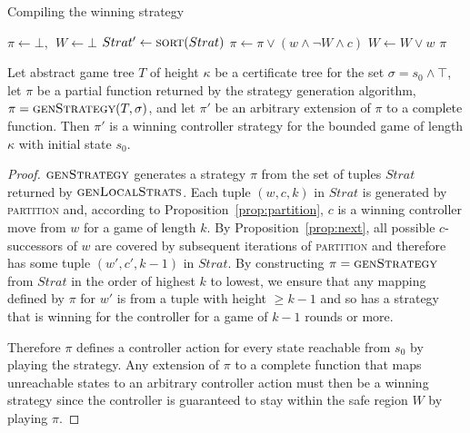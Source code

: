 \begin{algorithm}[t]
   \caption{Compiling the  winning strategy}\label{alg:compile}
   \begin{algorithmic}[1]
            \State $\pi \gets \bot,~~W \gets \bot$
            \State $Strat' \gets \Call{sort}{Strat}$ 
            \State $\pi \gets \pi \lor (w \land \neg W \land c)$
                \State $W \gets W \lor w$
            \EndFor
            \State \Return $\pi$
        \EndFunction
    \end{algorithmic}
\end{algorithm}

\begin{theorem}\label{th:stratCorrectness}
Let abstract game tree $T$ of height $\kappa$ be a certificate tree for the set $\sigma = s_0 \land \top$, let $\pi$ be a partial function returned by the strategy generation algorithm, $\pi=\textsc{genStrategy}(T,\sigma)$, and let $\pi'$ be an arbitrary extension of $\pi$ to a complete function.  Then $\pi'$ is a winning controller strategy for the bounded game of length $\kappa$ with initial state $s_0$.
\end{theorem}
\begin{proof}
    $\textsc{genStrategy}$ generates a strategy $\pi$ from the set of tuples $Strat$ returned by $\textsc{genLocalStrats}$. Each tuple $(w, c, k)$ in $Strat$ is generated by \textsc{partition} and, according to Proposition~\ref{prop:partition}, $c$ is a winning controller move from $w$ for a game of length $k$. By Proposition~\ref{prop:next}, all possible $c$-successors of $w$ are covered by subsequent iterations of \textsc{partition} and therefore has some tuple $(w', c', k-1)$ in $Strat$. By constructing $\pi = \textsc{genStrategy}$ from $Strat$ in the order of highest $k$ to lowest, we ensure that any mapping defined by $\pi$ for $w'$ is from a tuple with height $\geq k-1$ and so has a strategy that is winning for the controller for a game of $k-1$ rounds or more.  
    
    Therefore $\pi$ defines a controller action for every state reachable from $s_0$ by playing the strategy. Any extension of $\pi$ to a complete function that maps unreachable states to an arbitrary controller action must then be a winning strategy since the controller is guaranteed to stay within the safe region $W$ by playing $\pi$.
\end{proof}

